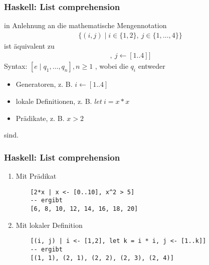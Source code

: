 \documentclass{beamer}
\begin{document}
\begin{frame}[fragile]
\frametitle{Haskell: List comprehension}
in Anlehnung an die mathematische Mengennotation
\begin{gather*}
    \{(i,j) \mid i \in \{1, 2\},\: j \in \{1, \dots, 4\}\}
\end{gather*}
ist äquivalent zu
\begin{gather*}
    [(i, j) \mid i \leftarrow [1,2],\: j \leftarrow [1..4]]
\end{gather*}
Syntax: $[e \mid q_1, \dots, q_n], n \geq 1$ , wobei die $q_i$ entweder
\begin{itemize}
    \item Generatoren, z. B. $i \leftarrow \left[1..4\right]$
    \item lokale Definitionen, z. B. $let\:i = x * x$
    \item Prädikate, z. B. $x > 2$
\end{itemize}
sind.
\end{frame}

\begin{frame}[t, fragile]
\frametitle{Haskell: List comprehension}
\begin{examples}
\begin{enumerate}
    \item Mit Prädikat
    \begin{lstlisting}
    [2*x | x <- [0..10], x^2 > 5]
    -- ergibt
    [6, 8, 10, 12, 14, 16, 18, 20]
    \end{lstlisting}
    \item Mit lokaler Definition
    \begin{lstlisting}
    [(i, j) | i <- [1,2], let k = i * i, j <- [1..k]]
    -- ergibt
    [(1, 1), (2, 1), (2, 2), (2, 3), (2, 4)]
\end{lstlisting}
\end{enumerate}
\end{examples}
\end{frame}
\end{document}
